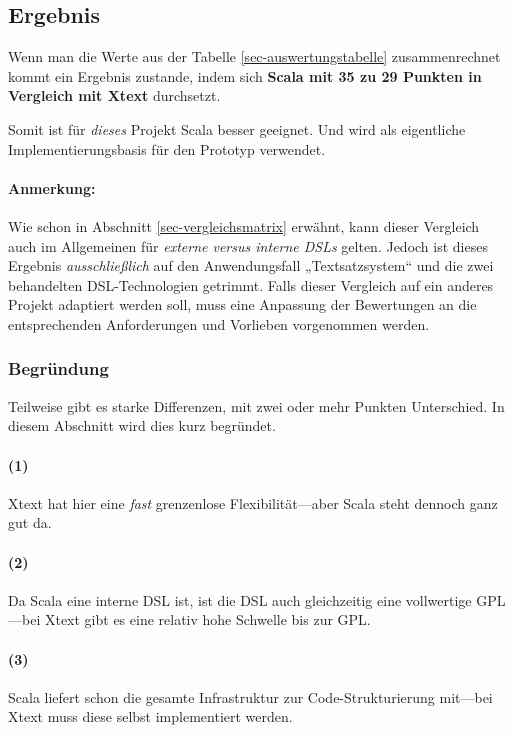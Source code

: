 \subsection{Ergebnis}

Wenn man die Werte aus der Tabelle \ref{sec-auswertungstabelle} zusammenrechnet
kommt ein Ergebnis zustande, indem sich \textbf{Scala mit 35 zu
29 Punkten in Vergleich mit Xtext} durchsetzt.

Somit ist für \emph{dieses} Projekt Scala besser geeignet.
Und wird als eigentliche Implementierungsbasis für den Prototyp verwendet.

\paragraph{Anmerkung:} Wie schon in Abschnitt \ref{sec-vergleichsmatrix}
erwähnt, kann dieser Vergleich auch im Allgemeinen für \emph{externe versus
interne DSLs} gelten. Jedoch ist dieses Ergebnis \emph{ausschließlich}
auf den Anwendungsfall „Textsatzsystem“ und die zwei
behandelten DSL-Technologien getrimmt. Falls dieser Vergleich
auf ein anderes Projekt adaptiert werden soll, muss eine Anpassung der
Bewertungen an die entsprechenden Anforderungen und Vorlieben vorgenommen werden.

\subsubsection{Begründung}

Teilweise gibt es starke Differenzen, mit zwei oder mehr Punkten Unterschied.
In diesem Abschnitt wird dies kurz begründet.

\paragraph{(1)} Xtext hat hier eine \emph{fast} grenzenlose
Flexibilität---aber Scala steht dennoch ganz gut da.

\paragraph{(2)} Da Scala eine interne DSL ist, ist die DSL auch gleichzeitig
eine vollwertige GPL---bei Xtext gibt es eine relativ hohe Schwelle bis zur GPL.

\paragraph{(3)} Scala liefert schon die gesamte Infrastruktur zur
Code-Strukturierung mit---bei Xtext muss diese selbst implementiert werden.

